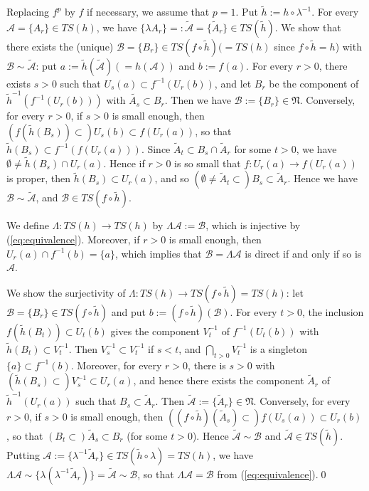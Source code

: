 \documentclass[a4paper,12pt]{amsart}
\theoremstyle{plain}
\theoremstyle{definition}
\theoremstyle{remark}
\numberwithin{equation}{section}
\begin{document}
Replacing $f^p$ by $f$ if necessary,
we assume that $p=1$. Put $\tilde{h}:=h\circ\lambda^{-1}$.
For every $\mathcal{A}=\{A_r\}\in{\mathit{TS}}(h)$, 
we have $\{\lambda A_r\}=:\tilde{\mathcal{A}}=\{\tilde{A}_r\}\in{\mathit{TS}}(\tilde{h})$.
We show that there exists the (unique)
$\mathcal{B}=\{B_r\}\in{\mathit{TS}}(f\circ\tilde{h})(={\mathit{TS}}(h)$ since $f\circ\tilde{h}=h$)
with $\mathcal{B}\sim\tilde{\mathcal{A}}$:
put $a:=\tilde{h}(\tilde{\mathcal{A}})(=h(\mathcal{A}))$ and $b:=f(a)$.
For every $r>0$, there exists $s>0$ such that $U_s(a)\subset f^{-1}(U_r(b))$,
and let $B_r$ be the component of
$\tilde{h}^{-1}(f^{-1}(U_r(b)))$ with $\tilde{A_s}\subset B_r$. Then we have
$\mathcal{B}:=\{B_r\}\in\mathfrak{N}$.
Conversely, for every $r>0$, if $s>0$ is small enough, then
$(f(\tilde{h}(B_s))\subset)U_s(b)\subset f(U_r(a))$,
so that $\tilde{h}(B_s)\subset f^{-1}(f(U_r(a)))$.
Since $\tilde{A}_t\subset B_s\cap\tilde{A}_r$ for some $t>0$,
we have $\emptyset\neq\tilde{h}(B_s)\cap U_r(a)$.
Hence if $r>0$ is so small that $f:U_r(a)\to f(U_r(a))$ is proper, 
then $\tilde{h}(B_s)\subset U_r(a)$,
and so $(\emptyset\neq\tilde{A}_t\subset)B_s\subset\tilde{A}_r$.
Hence we have $\mathcal{B}\sim\tilde{\mathcal{A}}$,
and $\mathcal{B}\in{\mathit{TS}}(f\circ\tilde{h})$.

We define $\Lambda:{\mathit{TS}}(h)\to{\mathit{TS}}(h)$ by $\Lambda\mathcal{A}:=\mathcal{B}$,
which is injective by (\ref{eq:equivalence}).
Moreover, if $r>0$ is small enough, then $U_r(a)\cap f^{-1}(b)=\{a\}$,
which implies that $\mathcal{B}=\Lambda\mathcal{A}$ is direct
if and only if so is $\mathcal{A}$.

We show the surjectivity of $\Lambda:{\mathit{TS}}(h)\to{\mathit{TS}}(f\circ\tilde{h})={\mathit{TS}}(h)$:
let $\mathcal{B}=\{B_r\}\in{\mathit{TS}}(f\circ\tilde{h})$ and
put $b:=(f\circ\tilde{h})(\mathcal{B})$.
For every $t>0$, the inclusion $f(\tilde{h}(B_t))\subset U_t(b)$ gives
the component $V^{-1}_t$ of $f^{-1}(U_t(b))$ with
$\tilde{h}(B_t)\subset V^{-1}_t$. Then $V^{-1}_s\subset V^{-1}_t$ if $s<t$,
and $\bigcap_{t>0}V^{-1}_t$ is a singleton $\{a\}\subset f^{-1}(b)$.
Moreover, for every $r>0$, there is $s>0$ 
with $(\tilde{h}(B_s)\subset)V^{-1}_s\subset U_r(a)$, and hence
there exists the component $\tilde{A}_r$ of $\tilde{h}^{-1}(U_r(a))$
such that $B_s\subset\tilde{A}_r$.
Then $\tilde{\mathcal{A}}:=\{\tilde{A}_r\}\in\mathfrak{N}$.
Conversely, for every $r>0$, if $s>0$ is small enough,
then $((f\circ\tilde{h})(\tilde{A}_s)\subset)f(U_s(a))\subset U_r(b)$,
so that $(B_t\subset)\tilde{A}_s\subset B_r$ (for some $t>0$).
Hence $\tilde{\mathcal{A}}\sim\mathcal{B}$ and $\tilde{\mathcal{A}}\in{\mathit{TS}}(\tilde{h})$.
Putting $\mathcal{A}:=\{\lambda^{-1}\tilde{A}_r\}\in{\mathit{TS}}(\tilde{h}\circ\lambda)={\mathit{TS}}(h)$,
we have $\Lambda\mathcal{A}\sim\{\lambda(\lambda^{-1}\tilde{A}_r)\}=\tilde{\mathcal{A}}\sim\mathcal{B}$, so that $\Lambda\mathcal{A}=\mathcal{B}$ from (\ref{eq:equivalence}).\qed
\end{document}
